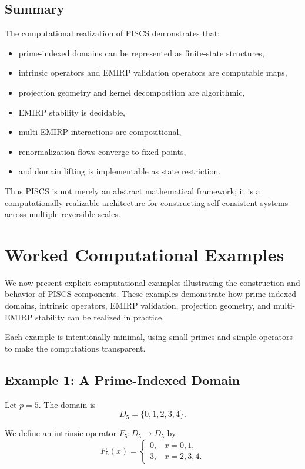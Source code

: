\documentclass[11pt]{article}
\theoremstyle{definition}
\theoremstyle{plain}
\theoremstyle{remark}
\begin{document}
\subsection{Summary}

The computational realization of PISCS demonstrates that:

\begin{itemize}
    \item prime-indexed domains can be represented as finite-state
    structures,
    \item intrinsic operators and EMIRP validation operators are
    computable maps,
    \item projection geometry and kernel decomposition are algorithmic,
    \item EMIRP stability is decidable,
    \item multi-EMIRP interactions are compositional,
    \item renormalization flows converge to fixed points,
    \item and domain lifting is implementable as state restriction.
\end{itemize}

Thus PISCS is not merely an abstract mathematical framework; it is a
computationally realizable architecture for constructing self-consistent
systems across multiple reversible scales.

\section{Worked Computational Examples}

We now present explicit computational examples illustrating the
construction and behavior of PISCS components. These examples demonstrate
how prime-indexed domains, intrinsic operators, EMIRP validation,
projection geometry, and multi-EMIRP stability can be realized in
practice.

Each example is intentionally minimal, using small primes and simple
operators to make the computations transparent.

\subsection{Example 1: A Prime-Indexed Domain}

Let $p = 5$. The domain is
\[
D_5 = \{0,1,2,3,4\}.
\]

We define an intrinsic operator $F_5 : D_5 \to D_5$ by
\[
F_5(x) = 
\begin{cases}
0, & x = 0,1, \\
3, & x = 2,3,4.
\end{cases}
\]
\end{document}
